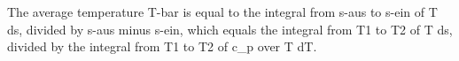The average temperature T-bar is equal to the integral from s-aus to s-ein of T ds, divided by s-aus minus s-ein, which equals the integral from T1 to T2 of T ds, divided by the integral from T1 to T2 of c_p over T dT.